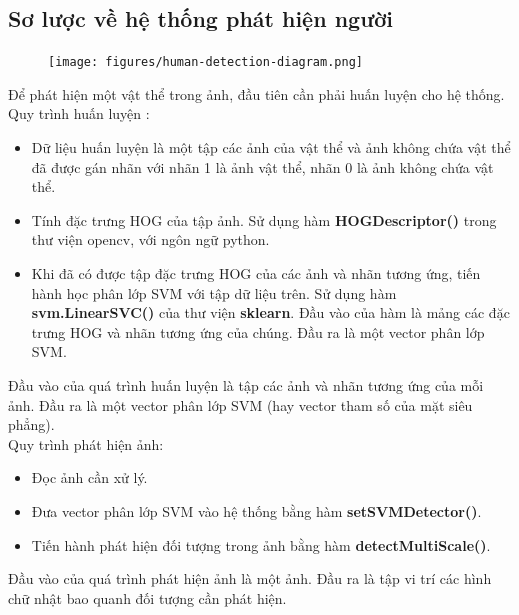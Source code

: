 \documentclass[../report.tex]{subfiles}
\begin{document}
\subsection{Sơ lược về hệ thống phát hiện người}

\begin{figure}[H]
\centering
\texttt{[image: figures/human-detection-diagram.png]}
\end{figure}

Để phát hiện một vật thể trong ảnh, 
đầu tiên cần phải huấn luyện cho hệ thống. \\
Quy trình huấn luyện \cite{hog-svm}: 
\begin{itemize}
\item Dữ liệu huấn luyện là một tập các ảnh của vật 
    thể và ảnh không chứa vật thể đã được gán nhãn 
    với nhãn 1 là ảnh vật thể, nhãn 0 là ảnh không chứa vật thể.
\item Tính đặc trưng HOG của tập ảnh. 
    Sử dụng hàm \textbf{HOGDescriptor()} trong thư viện opencv, 
    với ngôn ngữ python.
\item 
Khi đã có được tập đặc trưng HOG của các ảnh và 
nhãn tương ứng, tiến hành học phân lớp SVM với tập 
dữ liệu trên. Sử dụng hàm \textbf{svm.LinearSVC()} 
của thư viện \textbf{sklearn}. Đầu vào của hàm là mảng các đặc 
trưng HOG và nhãn tương ứng của chúng. Đầu ra là 
một vector phân lớp SVM.
\end{itemize}
Đầu vào của quá trình huấn luyện là tập các ảnh và 
nhãn tương ứng của mỗi ảnh. Đầu ra là một vector phân lớp SVM 
(hay vector tham số của mặt siêu phẳng). \\[3mm]
Quy trình phát hiện ảnh:
\begin{itemize}
    \item Đọc ảnh cần xử lý.
    \item Đưa vector phân lớp SVM vào hệ thống bằng 
        hàm \textbf{setSVMDetector()}.
    \item Tiến hành phát hiện đối tượng trong ảnh bằng 
        hàm \textbf{detectMultiScale()}.
\end{itemize}
Đầu vào của quá trình phát hiện ảnh là một ảnh. 
Đầu ra là tập vi trí các hình chữ nhật bao 
quanh đối tượng cần phát hiện.
\end{document}
